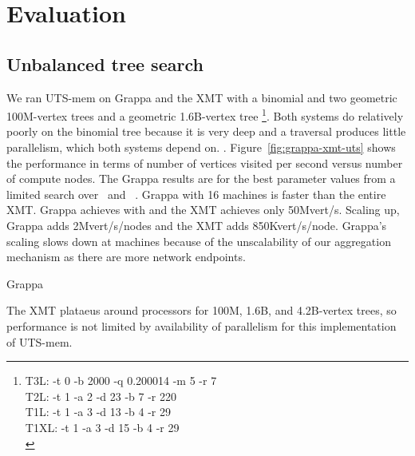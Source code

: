 \section{Evaluation} \label{sec:evaluation}

\subsection{Unbalanced tree search}

We ran UTS-mem on Grappa and the XMT with a binomial and two geometric
100M-vertex trees and a geometric 1.6B-vertex tree
\footnote{T3L: -t 0 -b 2000 -q 0.200014 -m 5 -r 7\\
          T2L: -t 1 -a 2 -d 23 -b 7 -r 220\\
          T1L: -t 1 -a 3 -d 13 -b 4 -r 29\\
          T1XL: -t 1 -a 3 -d 15 -b 4 -r 29\\}.
Both systems do relatively poorly on the binomial tree because it is very deep and a
traversal produces little parallelism, which both systems depend on.
. Figure~\ref{fig:grappa-xmt-uts}
shows the performance in terms of number of vertices visited per
second versus number of compute nodes. The Grappa results are for the
best parameter values from a limited search over \flushtimeout~and
\asyncforthr~.
Grappa with 16 machines is faster than the entire XMT. Grappa achieves
 with  and the
XMT achieves only 50Mvert/s. Scaling up, Grappa adds 2Mvert/s/nodes
and the XMT adds 850Kvert/s/node. Grappa's scaling slows down at
 machines because of the unscalability of our aggregation
mechanism as there are more network endpoints.

Grappa

The XMT plataeus around  processors for 100M, 1.6B, and
4.2B-vertex trees, so performance is not limited by availability of
parallelism for this implementation of UTS-mem.



